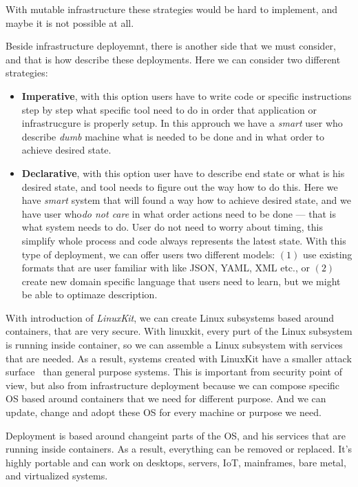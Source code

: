 With mutable infrastructure these strategies would be hard to implement, and maybe it is not possible at all. 

Beside infrastructure deployemnt, there is another side that we must consider, and that is how describe these deployments. Here we can consider two different strategies:
\begin{itemize}
	\item \textbf{Imperative}, with this option users have to write code or specific instructions step by step what specific tool need to do in order that application or infrastrucgure is properly setup. In this approuch we have a \textit{smart} user who describe \textit{dumb} machine what is needed to be done and in what order to achieve desired state.
	\item \textbf{Declarative}, with this option user have to describe end state or what is his desired state, and tool needs to figure out the way how to do this. Here we have \textit{smart} system that will found a way how to achieve desired state, and we have user who\textit{do not care} in what order actions need to be done --- that is what system needs to do. User do not need to worry about timing, this simplify whole process and code always represents the latest state. With this type of deployment, we can offer users two different models: $(1)$ use existing formats that are user familiar with like JSON, YAML, XML etc., or $(2)$ create new domain specific language that users need to learn, but we might be able to optimaze description.
\end{itemize}

With introduction of \textit{LinuxKit}, we can create Linux subsystems based around containers, that  are very secure. With linuxkit, every purt of the Linux subsystem is running inside container, so we can assemble a Linux subsystem with services that are needed. As a result, systems created with LinuxKit have a smaller attack surface~\cite{abs-1802-10375} than general purpose systems. This is important from security point of view, but also from infrastructure deployment because we can compose specific OS based around containers that we need for different purpose. And we can update, change and adopt these OS for every machine or purpose we need.

Deployment is based around changeint parts of the OS, and his services that are running inside containers. As a result, everything can be removed or replaced. It's highly portable and can work on desktops, servers, IoT, mainframes, bare metal, and virtualized systems.
%
%
